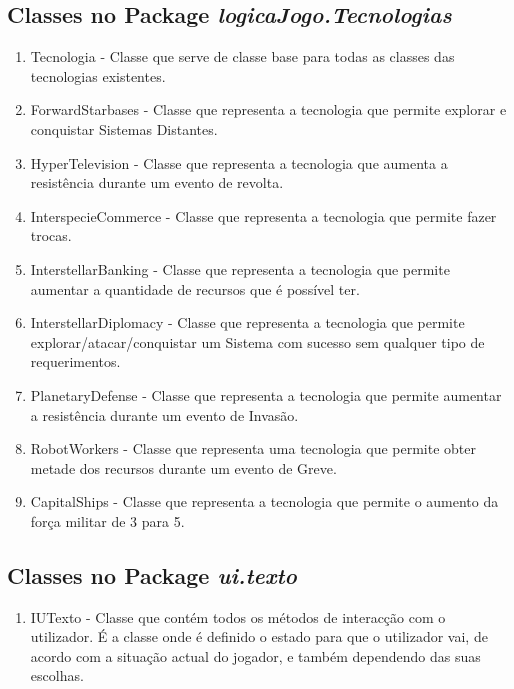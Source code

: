 \documentclass[12pt,a4paper]{article}
\begin{document}
\subsection{Classes no Package \textit{logicaJogo.Tecnologias}}

\begin{enumerate}
\item Tecnologia - Classe que serve de classe base para todas as classes das tecnologias existentes.
\item ForwardStarbases - Classe que representa a tecnologia que permite explorar e conquistar Sistemas Distantes.
\item HyperTelevision - Classe que representa a tecnologia que aumenta a resistência durante um evento de revolta.
\item InterspecieCommerce - Classe que representa a tecnologia que permite fazer trocas.
\item InterstellarBanking - Classe que representa a tecnologia que permite aumentar a quantidade de recursos que é possível ter.
\item InterstellarDiplomacy - Classe que representa a tecnologia que permite explorar/atacar/conquistar um Sistema com sucesso sem qualquer tipo de requerimentos.
\item PlanetaryDefense - Classe que representa a tecnologia que permite aumentar a resistência durante um evento de Invasão.
\item RobotWorkers - Classe que representa uma tecnologia que permite obter metade dos recursos durante um evento de Greve.
\item CapitalShips - Classe que representa a tecnologia que permite o aumento da força militar de 3 para 5.
\end{enumerate}

\newpage\noindent

\subsection{Classes no Package \textit{ui.texto}}

\begin{enumerate}
\item IUTexto - Classe que contém todos os métodos de interacção com o utilizador. É a classe onde é definido o estado para que o utilizador vai, de acordo com a situação actual do jogador, e também dependendo das suas escolhas.
\end{enumerate}

\newpage\noindent
\end{document}
